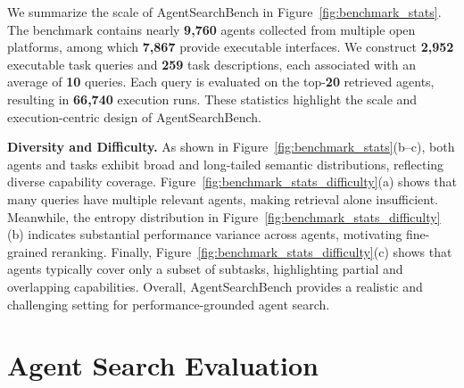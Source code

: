 \documentclass{article} %
\newcommand{\OURSBENCH}{AgentSearchBench}
\def \FIG {Figure}
\begin{document}
We summarize the scale of \OURSBENCH{} in \FIG~\ref{fig:benchmark_stats}. The benchmark contains nearly \textbf{9,760} agents collected from multiple open platforms, among which \textbf{7,867} provide executable interfaces. We construct \textbf{2,952} executable task queries and \textbf{259} task descriptions, each associated with an average of \textbf{10} queries. Each query is evaluated on the top-\textbf{20} retrieved agents, resulting in \textbf{66,740} execution runs. These statistics highlight the scale and execution-centric design of \OURSBENCH{}.

\textbf{Diversity and Difficulty. }
As shown in \FIG~\ref{fig:benchmark_stats}(b–c), both agents and tasks exhibit broad and long-tailed semantic distributions, reflecting diverse capability coverage. \FIG~\ref{fig:benchmark_stats_difficulty}(a) shows that many queries have multiple relevant agents, making retrieval alone insufficient. Meanwhile, the entropy distribution in \FIG~\ref{fig:benchmark_stats_difficulty}(b) indicates substantial performance variance across agents, motivating fine-grained reranking. Finally, \FIG~\ref{fig:benchmark_stats_difficulty}(c) shows that agents typically cover only a subset of subtasks, highlighting partial and overlapping capabilities. Overall, \OURSBENCH{} provides a realistic and challenging setting for performance-grounded agent search.

\section{Agent Search Evaluation}
\end{document}
